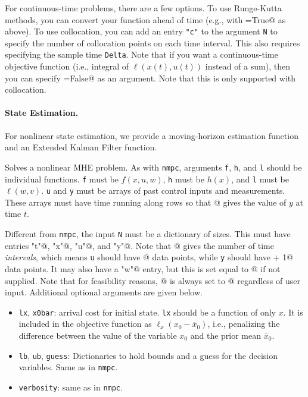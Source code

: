\documentclass{article}
\begin{document}
\begin{multicols}{2}
For continuous-time problems, there are a few options.
To use Runge-Kutta methods, you can convert your function ahead of time (e.g., with =True@ as above).
To use collocation, you can add an entry \lstinline|"c"| to the argument \texttt{N} to specify the number of collocation points on each time interval.
This also requires specifying the sample time \texttt{Delta}.
Note that if you want a continuous-time objective function (i.e., integral of $\ell(x(t),u(t))$ instead of a sum), then you can specify \lstinline@discretel=False@ as an argument.
Note that this is only supported with collocation.

\paragraph*{State Estimation.}

For nonlinear state estimation, we provide a moving-horizon estimation function and an Extended Kalman Filter function.


Solves a nonlinear MHE problem.
As with \texttt{nmpc}, arguments \texttt{f}, \texttt{h}, and \texttt{l} should be individual \casadi{} functions.
\texttt{f} must be $f(x,u,w)$, \texttt{h} must be $h(x)$, and \texttt{l} must be $\ell(w,v)$.
\texttt{u} and \texttt{y} must be arrays of past control inputs and measurements.
These arrays must have time running along rows so that \lstinline@y[t,:]@ gives the value of $y$ at time $t$.

Different from \texttt{nmpc}, the input \texttt{N} must be a dictionary of sizes.
This must have entries \lstinline@"t"@, \lstinline@"x"@, \lstinline@"u"@, and \lstinline@"y"@.
Note that \lstinline@N["t"]@ gives the number of time \emph{intervals}, which means \texttt{u} should have \lstinline@N["t"]@ data points, while \texttt{y} should have \lstinline@N["t"] + 1@ data points.
It may also have a \lstinline@"w"@ entry, but this is set equal to \lstinline@N["x"]@ if not supplied.
Note that for feasibility reasons, \lstinline@N["v"]@ is always set to \lstinline@N["y"]@ regardless of user input. Additional optional arguments are given below.

\begin{itemize}[noitemsep,nolistsep]
    \item \texttt{lx}, \texttt{x0bar}: arrival cost for initial state.
    \texttt{lx} should be a \casadi{} function of only $x$.
    It is included in the objective function as $\ell_x(x_0 - \overline{x}_0)$, i.e., penalizing the difference between the value of the variable $x_0$ and the prior mean $\overline{x}_0$.
    \item \texttt{lb}, \texttt{ub}, \texttt{guess}: Dictionaries to hold bounds and a guess for the decision variables.
    Same as in \texttt{nmpc}.
    \item \texttt{verbosity}: same as in \texttt{nmpc}.
\end{itemize}


\end{multicols}
\end{document}
